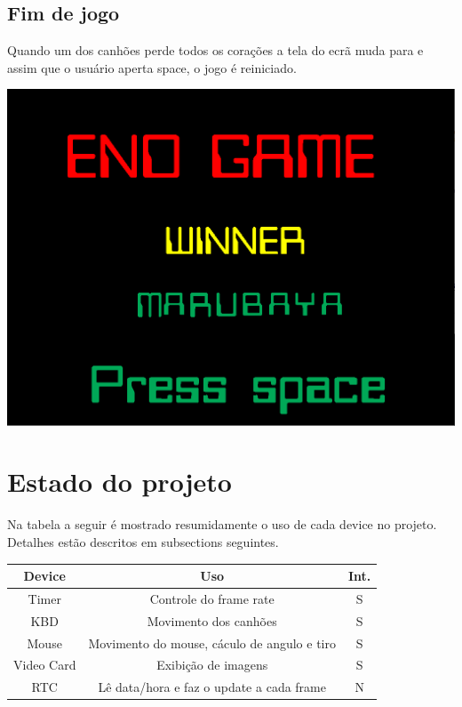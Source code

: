 \documentclass[12pt]{article}
\begin{document}
\subsection{Fim de jogo}
Quando um dos canhões perde todos os corações a tela do ecrã muda para e assim que o usuário aperta space, o jogo é reiniciado. 
\newline
\begin{center}
    \includegraphics[width = 14cm]{Fim de Jogo.png}
\end{center}
\newpage
\section{Estado do projeto}
Na tabela a seguir é mostrado resumidamente o uso de cada device no projeto. Detalhes estão descritos em subsections seguintes.
\newline
\begin{center}
    \begin{tabular}{|c|c|c|}
        \hline
        \textbf{Device} & \textbf{Uso} & \textbf{Int.}\\
        \hline
        Timer & Controle do frame rate & S\\
        KBD & Movimento dos canhões & S\\
        Mouse & Movimento do mouse, cáculo de angulo e tiro& S\\
        Video Card & Exibição de imagens& S\\
        RTC & Lê data/hora e faz o update a cada frame& N\\
        \hline
    \end{tabular}
\end{center}
\end{document}
